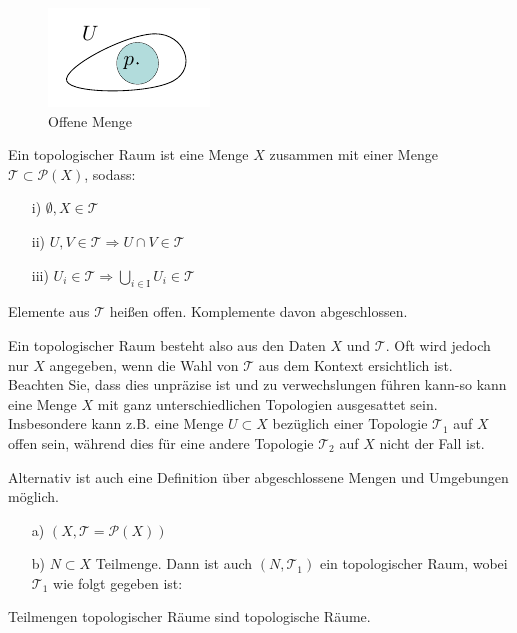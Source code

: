 \begin{figure}[H]
\centering
\includegraphics[scale=1.5]{figures/tikz/openset.pdf}
\caption{Offene Menge}
\label{img:offenemenge}
\end{figure} 

\begin{defs}
Ein topologischer Raum ist eine Menge $X$ zusammen mit einer Menge $\mathcal{T} \subset \mathcal{P}(X)$, sodass:
\begin{enumerate}
\item[i)] $\emptyset, X \in \mathcal{T}$
\item[ii)] $U, V \in \mathcal{T} \Rightarrow  U \cap V \in \mathcal{T}$
\item [iii)] $U_i \in \mathcal{T} \Rightarrow\bigcup\limits_{i \in \text{I}} U_i \in \mathcal{T}$
\end{enumerate} 
Elemente aus $\mathcal{T}$ heißen offen. 
Komplemente davon abgeschlossen.
\end{defs}

Ein topologischer Raum besteht also aus den Daten $X$ und $\mathcal{T}$.
Oft wird jedoch nur $X$ angegeben, wenn die Wahl von $\mathcal{T}$ aus dem Kontext ersichtlich ist.
Beachten Sie, dass dies unpräzise ist und zu verwechslungen führen kann-so kann eine Menge $X$ mit ganz unterschiedlichen Topologien ausgesattet sein. 
Insbesondere kann z.B. eine Menge $U\subset X$ bezüglich einer Topologie $\mathcal{T}_1$ auf $X$ offen sein, während dies für eine andere Topologie $\mathcal{T}_2$ auf $X$
nicht der Fall ist.

\begin{bem}
Alternativ ist auch eine Definition über abgeschlossene Mengen und Umgebungen möglich.
\end{bem}

\begin{bsp}
\begin{enumerate}
	\item[a)] $( X, \mathcal{T} = \mathcal{P}(X) )$
	\item[b)] $N \subset X$ Teilmenge. Dann ist auch $(N,\mathcal{T}_1)$ ein topologischer Raum, wobei $\mathcal{T}_1$ wie folgt gegeben ist:\\
\end{enumerate}
Teilmengen topologischer Räume sind topologische Räume.
\end{bsp}

